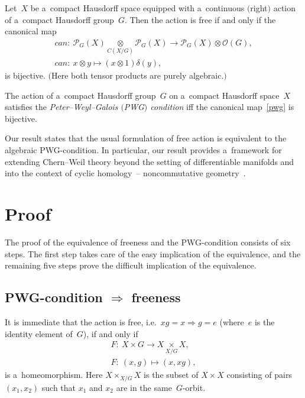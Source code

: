 \begin{theorem}\label{theoGal}
Let~$X$ be a~compact Hausdorff space equipped with a~continuous $($right$)$ action of a~compact Hausdorff group~$G$.
Then the action is free if and only if the canonical map
\begin{gather}
{can} \colon \ \mathcal{P}_G(X)\underset{C(X/G)}{\otimes} \mathcal{P}_G(X) \longrightarrow \mathcal{P}_G(X)\otimes
\mathcal{O}(G),
\nonumber
\\
{can}\colon \ x\otimes y \longmapsto (x\otimes 1)\delta(y),
\label{pwg}
\end{gather}
is bijective.
$($Here both tensor products are purely algebraic.$)$
\end{theorem}
\begin{definition}
The action of a~compact Hausdorf\/f group~$G$ on a~compact Hausdorf\/f space~$X$ satisf\/ies the \emph{Peter--Weyl--Galois
$($PWG$)$ condition} if\/f the canonical map~\eqref{pwg} is bijective.
\end{definition}
\noindent Our result states that the usual formulation of free action is equivalent to the algebraic PWG-condition.
In particular, our result provides a~framework for extending Chern--Weil theory beyond the setting of dif\/ferentiable
manifolds and into the context of cyclic homology~--
noncommutative geometry~\cite{bh04}.

\section{Proof}

The proof of the equivalence of freeness and the PWG-condition consists of six steps.
The f\/irst step takes care of the easy implication of the equivalence, and the remaining f\/ive steps prove the dif\/f\/icult
implication of the equivalence.

\subsection[PWG-condition $\Rightarrow$ freeness]{PWG-condition $\boldsymbol{\Rightarrow}$ freeness}

It is immediate that the action is free, i.e.\ $xg=x \Longrightarrow g=e$ (where~$e$ is the identity element of~$G$), if
and only if
\begin{gather*}
F\colon \  X
\times
G  \longrightarrow X\underset{X/G}{
\times
}X,
\\
F\colon \  (x,g)  \longmapsto (x,xg),
\end{gather*}
is a~homeomorphism.
Here $X
\times
_{X/G}X$ is the subset of $X
\times
X$ consisting of pairs $(x_1, x_2)$ such that $x_1$ and $x_2$ are in the same~$G$-orbit.

